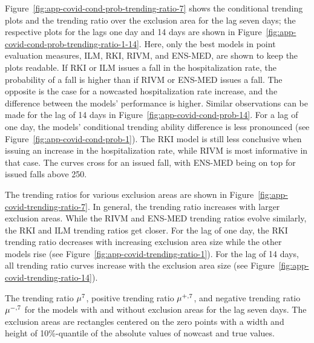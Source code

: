 Figure~\ref{fig:app-covid-cond-prob-trending-ratio-7} shows the conditional trending plots and the trending ratio over the exclusion area for the lag seven days; the respective plots for the lags one day and 14 days are shown in Figure~\ref{fig:app-covid-cond-prob-trending-ratio-1-14}.
Here, only the best models in point evaluation measures, ILM, RKI, RIVM, and ENS-MED, are shown to keep the plots readable.
If RKI or ILM issues a fall in the hospitalization rate, the probability of a fall is higher than if RIVM or ENS-MED issues a fall.
The opposite is the case for a nowcasted hospitalization rate increase, and the difference between the models' performance is higher.
Similar observations can be made for the lag of 14 days in Figure~\ref{fig:app-covid-cond-prob-14}.
For a lag of one day, the models' conditional trending ability difference is less pronounced (see Figure~\ref{fig:app-covid-cond-prob-1}).
The RKI model is still less conclusive when issuing an increase in the hospitalization rate, while RIVM is most informative in that case.
The curves cross for an issued fall, with ENS-MED being on top for issued falls above 250.

The trending ratios for various exclusion areas are shown in Figure~\ref{fig:app-covid-trending-ratio-7}.
In general, the trending ratio increases with larger exclusion areas.
While the RIVM and ENS-MED trending ratios evolve similarly, the RKI and ILM trending ratios get closer.
For the lag of one day, the RKI trending ratio decreases with increasing exclusion area size while the other models rise (see Figure~\ref{fig:app-covid-trending-ratio-1}).
For the lag of 14 days, all trending ratio curves increase with the exclusion area size (see Figure~\ref{fig:app-covid-trending-ratio-14}).

\begin{table}
    \centering
    \tiny
    
    \caption{The trending ratio $\accl[7]$, positive trending ratio $\accpl[7]$, and negative trending ratio $\accml[7]$ for the models with and without exclusion areas for the lag seven days. The exclusion areas are rectangles centered on the zero points with a width and height of 10\%-quantile of the absolute values of nowcast and true values. }
    \label{tab:app-covid-trending-ratios-lag-7}
\end{table}


